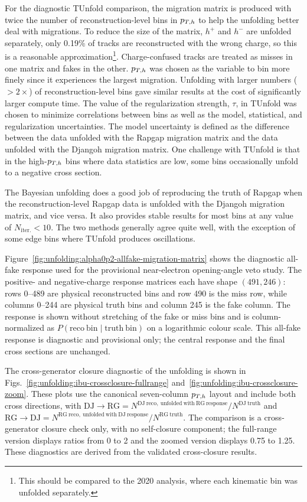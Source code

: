 For the diagnostic TUnfold comparison, the migration matrix is produced with twice the number of reconstruction-level bins in $p_{T,h}$ to help the unfolding better deal with migrations. To reduce the size of the matrix, $h^+$ and $h^-$ are unfolded separately, only 0.19\% of tracks are reconstructed with the wrong charge, so this is a reasonable approximation\footnote{This should be compared to the 2020 analysis, where each kinematic bin was unfolded separately.}. Charge-confused tracks are treated as misses in one matrix and fakes in the other. $p_{T,h}$ was chosen as the variable to bin more finely since it experiences the largest migration. Unfolding with larger numbers ($>2\times$) of reconstruction-level bins gave similar results at the cost of significantly larger compute time. The value of the regularization strength, $\tau$, in TUnfold was chosen to minimize correlations between bins as well as the model, statistical, and regularization uncertainties. The model uncertainty is defined as the difference between the data unfolded with the Rapgap migration matrix and the data unfolded with the Djangoh migration matrix. One challenge with TUnfold is that in the high-$p_{T,h}$ bins where data statistics are low, some bins occasionally unfold to a negative cross section.

The Bayesian unfolding does a good job of reproducing the truth of Rapgap when the reconstruction-level Rapgap data is unfolded with the Djangoh migration matrix, and vice versa. It also provides stable results for most bins at any value of $N_{\mathrm{iter.}}<10$. The two methods generally agree quite well, with the exception of some edge bins where TUnfold produces oscillations.

Figure~\ref{fig:unfolding:alpha0p2-allfake-migration-matrix} shows the diagnostic all-fake response used for the provisional near-electron opening-angle veto study. The positive- and negative-charge response matrices each have shape $(491,246)$: rows 0--489 are physical reconstructed bins and row 490 is the miss row, while columns 0--244 are physical truth bins and column 245 is the fake column. The response is shown without stretching of the fake or miss bins and is column-normalized as $P(\mathrm{reco\ bin}\mid\mathrm{truth\ bin})$ on a logarithmic colour scale. This all-fake response is diagnostic and provisional only; the central response and the final cross sections are unchanged.

The cross-generator closure diagnostic of the unfolding is shown in Figs.~\ref{fig:unfolding:ibu-crossclosure-fullrange} and~\ref{fig:unfolding:ibu-crossclosure-zoom}. These plots use the canonical seven-column $p_{T,h}$ layout and include both cross directions, with $\mathrm{DJ}\to\mathrm{RG}=N^{\mathrm{DJ\ reco,\ unfolded\ with\ RG\ response}}/N^{\mathrm{DJ\ truth}}$ and $\mathrm{RG}\to\mathrm{DJ}=N^{\mathrm{RG\ reco,\ unfolded\ with\ DJ\ response}}/N^{\mathrm{RG\ truth}}$. The comparison is a cross-generator closure check only, with no self-closure component; the full-range version displays ratios from 0 to 2 and the zoomed version displays 0.75 to 1.25. These diagnostics are derived from the validated cross-closure results.

